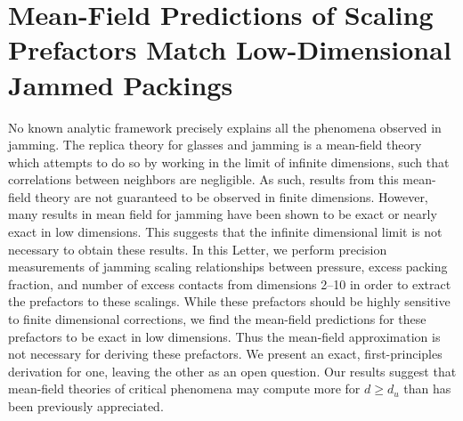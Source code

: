 
\chapter{Mean-Field Predictions of Scaling Prefactors Match Low-Dimensional Jammed Packings}
\author{James D. Sartor, Sean A. Ridout, Eric I. Corwin}

\label{excessContactsScaling}

No known analytic framework precisely explains all the phenomena observed in jamming. The replica theory for glasses and jamming is a mean-field theory which attempts to do so by working in the limit of infinite dimensions, such that correlations between neighbors are negligible. As such, results from this mean-field theory are not guaranteed to be observed in finite dimensions. However, many results in mean field for jamming have been shown to be exact or nearly exact in low dimensions. This suggests that the infinite dimensional limit is not necessary to obtain these results. In this Letter, we perform precision measurements of jamming scaling relationships between pressure, excess packing fraction, and number of excess contacts from dimensions 2--10 in order to extract the prefactors to these scalings. While these prefactors should be highly sensitive to finite dimensional corrections, we find the mean-field predictions for these prefactors to be exact in low dimensions. Thus the mean-field approximation is not necessary for deriving these prefactors. We present an exact, first-principles derivation for one, leaving the other as an open question. Our results suggest that mean-field theories of critical phenomena may compute more for $d\geq d_u$ than has been previously appreciated.


 
